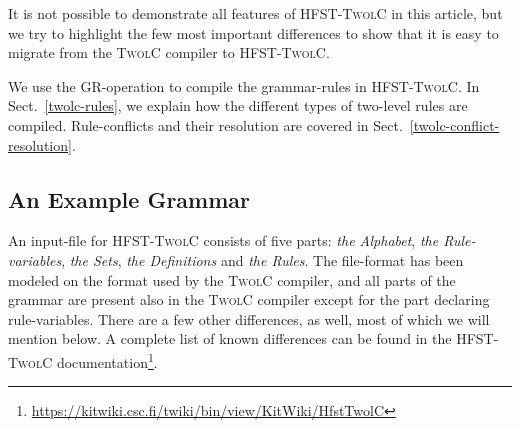 \documentclass[a4paper]{article}
\begin{document}
It is not possible to demonstrate all features of \textsc{HFST-TwolC}
in this article, but we try to highlight the few most important
differences to show that it is easy to migrate from the \textsc{TwolC}
compiler to \textsc{HFST-TwolC}.

We use the GR-operation to compile the grammar-rules in
\textsc{HFST-TwolC}. In Sect.~\ref{twolc-rules}, we explain how the
different types of two-level rules are compiled. Rule-conflicts and
their resolution are covered in Sect.~\ref{twolc-conflict-resolution}.

\subsection{An Example Grammar}\label{twolc-example}

An input-file for \textsc{HFST-TwolC} consists of five parts:
\textit{the Alphabet}, \textit{the Rule-variables}, \textit{the Sets},
\textit{the Definitions} and \textit{the Rules}. The file-format has
been modeled on the format used by the \textsc{TwolC} compiler, and
all parts of the grammar are present also in the \textsc{TwolC}
compiler except for the part declaring rule-variables. There are a few
other differences, as well, most of which we will mention below. A
complete list of known differences can be found in the
\textsc{HFST-TwolC}
documentation\footnote{\url{https://kitwiki.csc.fi/twiki/bin/view/KitWiki/HfstTwolC}}.
\end{document}

